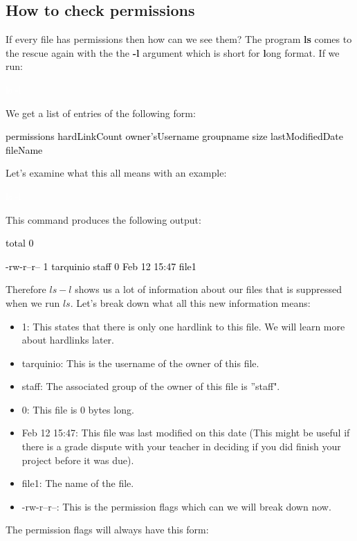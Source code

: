 \documentclass[oneside]{book}
\newcommand{\commandline}[1]{\begin{center} \colorbox{Dark}{\textcolor{white}{#1}} \end{center}}
\newcommand{\exampleout}[1]{\begin{center} \colorbox{Light}{\textcolor{black}{#1}} \end{center}}
\begin{document}
\subsection{How to check permissions}
If every file has permissions then how can we see them? The program \textbf{ls} comes to the rescue again with the the \textbf{-l} argument which is short for \textbf{l}ong format. If we run:
\commandline{ls -l}
We get a list of entries of the following form:
\exampleout{permissions hardLinkCount owner'sUsername groupname size lastModifiedDate fileName}
Let's examine what this all means with an example:
\commandline{ls -l}
This command produces the following output:
\exampleout{total 0}
\exampleout{-rw-r--r--  1 tarquinio  staff  0 Feb 12 15:47 file1}
Therefore $ls -l$ shows us a lot of information about our files that is suppressed when we run $ls$. Let's break down what all this new information means:
\begin{itemize}
    \item{1:} This states that there is only one hardlink to this file. We will learn more about hardlinks later.
    \item{tarquinio:} This is the username of the owner of this file.
    \item{staff:} The associated group of the owner of this file is ''staff".
    \item{0:} This file is 0 bytes long.
    \item{Feb 12 15:47:} This file was last modified on this date (This might be useful if there is a grade dispute with your teacher in deciding if you did finish your project before it was due).
    \item{file1:} The name of the file.
    \item{-rw-r--r--:} This is the permission flags which can we will break down now.
\end{itemize}
The permission flags will always have this form:
\end{document}
